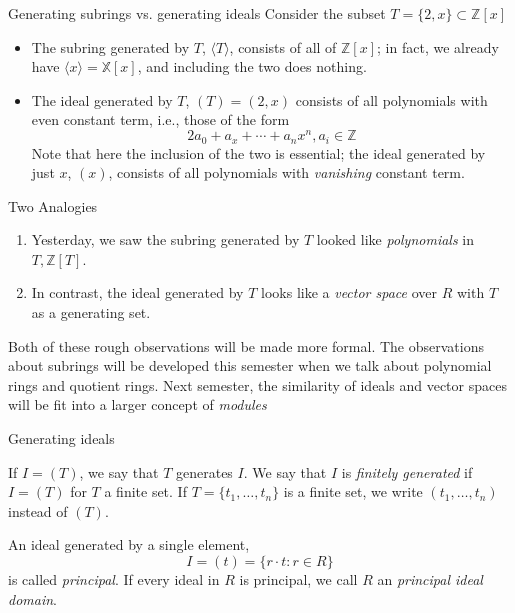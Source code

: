 \documentclass{beamer}
\begin{document}
\begin{frame}{Generating subrings vs. generating ideals}
Consider the subset $T=\{2,x\}\subset\mathbb{Z}[x]$ 
\begin{itemize}
\item The subring generated by $T$, $\langle T\rangle$, consists of all of $\mathbb{Z}[x]$; in fact, we already have $\langle x\rangle=\mathbb{X}[x]$, and including the two does nothing.
\item The ideal generated by $T$, $(T)=(2,x)$ consists of all polynomials with even constant term, i.e., those of the form
$$2a_0+a_x+\cdots+a_nx^n, a_i\in\mathbb{Z}$$
Note that here the inclusion of the two is essential; the ideal generated by just $x$, $(x)$, consists of all polynomials with \emph{vanishing} constant term.

\end{itemize}



\end{frame}




\begin{frame}{Two Analogies}

\begin{enumerate}
\item Yesterday, we saw the subring generated by $T$ looked like \emph{polynomials} in $T, \mathbb{Z}[T]$.

\item In contrast, the ideal generated by $T$ looks like a \emph{vector space} over $R$ with $T$ as a generating set.
\end{enumerate}

Both of these rough observations will be made more formal.   The observations about subrings will be developed this semester when we talk about polynomial rings and quotient rings.  Next semester, the similarity of ideals and vector spaces will be fit into a larger concept of \emph{modules}


\end{frame}

\begin{frame}{Generating ideals}

\begin{definition} If $I=(T)$, we say that $T$ generates $I$.  We say that $I$ is \emph{finitely generated} if $I=(T)$ for $T$ a finite set.  If $T=\{t_1,\dots, t_n\}$ is a finite set, we write $(t_1,\dots, t_n)$ instead of $(T)$.
\end{definition}

\begin{definition} An ideal generated by a single element, 
$$I=(t)=\{r\cdot t: r\in R\}$$
is called \emph{principal}.  If every ideal in $R$ is principal, we call $R$ an \emph{principal ideal domain}.
\end{definition}

\end{frame}
\end{document}
